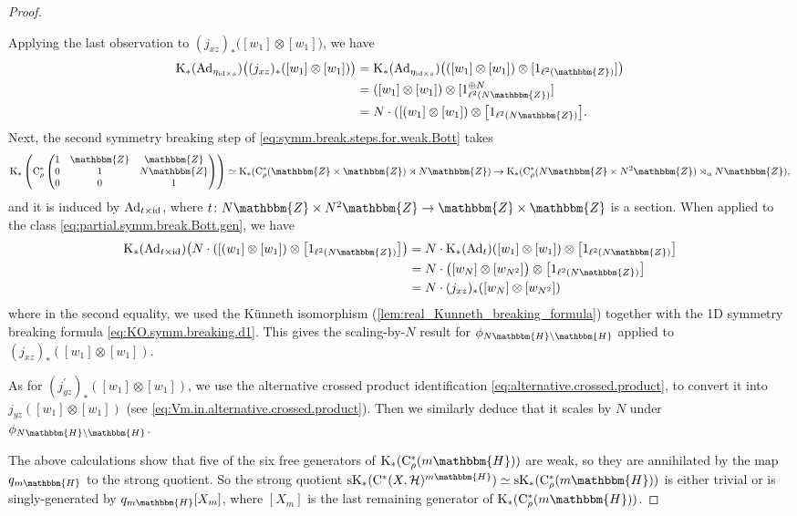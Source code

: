 \documentclass{amsart}
\numberwithin{figure}{section}
\numberwithin{equation}{section}
\numberwithin{table}{section}
\theoremstyle{plain}
\theoremstyle{definition}
\theoremstyle{remark}
\theoremstyle{nonumber}
\newcommand{\Z}{\mathbb{Z}}
\newcommand{\HH}{\mathbb{H}} %
\newcommand{\K}{\relax\ifmmode\operatorname{K}\else\textup{K}\fi}
\newcommand{\Cst}{\relax\ifmmode\mathrm{C}^*\else\textup{C*}\fi}
\newcommand{\Cstr}{\Cst_\rho} %
\newcommand{\Ad}{\operatorname{Ad}} %
\renewcommand{\mathbb}{\mathbbm} %
\begin{document}
\begin{proof}
\begin{itemize}
Applying the last observation to $(j_{xz})_*\big([w_{1}]\otimes [w_{1}]\big)$, we have
\begin{equation}\label{eq:partial.symm.break.Bott.gen}
\begin{aligned}
\K_*(\Ad_{\eta_{{\rm id}\times s}})\big((j_{xz})_*([w_1]\otimes [w_1])\big)
&=\K_*(\Ad_{\eta_{{\rm id}\times s}})\big(([w_1]\otimes [w_1])\otimes [1_{\ell^2(\Z)}]\big)\\
&=([w_1]\otimes [w_1])\otimes [1_{\ell^2(N\Z)}^{\oplus N}]\\
&=N\cdot ([(w_1]\otimes [w_1])\otimes \big[1_{\ell^2(N\Z)}\big].
\end{aligned}
\end{equation}
Next, the second symmetry breaking step of \eqref{eq:symm.break.steps.for.weak.Bott} takes
\[
\K_*\left(\Cstr\begin{pmatrix} 1 & \Z & \Z \\ 0 & 1 & N\Z\\ 0 & 0 & 1 \end{pmatrix}\right)\simeq \K_*(\Cstr(\Z\times \Z)\rtimes N\Z) \to\K_*(\Cstr(N\Z\times N^2\Z)\rtimes_\alpha N\Z),
\]
and it is induced by $\Ad_{t\times {\rm id}}$, where $t\colon N\Z\times N^2\Z\to \Z\times \Z$ is a section. When applied to the class \eqref{eq:partial.symm.break.Bott.gen}, we have
\begin{align*}
\K_*(\Ad_{t\times{\rm id}})\big(N\cdot ([(w_1]\otimes [w_1])\otimes \big[1_{\ell^2(N\Z)}\big]\big)
&=N\cdot\K_*(\Ad_t)([w_1]\otimes [w_1])\otimes \big[1_{\ell^2(N\Z)}\big]\\
&=N\cdot\big([w_N]\otimes [w_{N^2}]\big)\otimes \big[1_{\ell^2(N\Z)}\big]\\
&=N\cdot (j_{xz})_*([w_N]\otimes [w_{N^2}])
\end{align*}
where in the second equality, we used the K\"unneth isomorphism (\cref{lem:real_Kunneth_breaking_formula}) together with the 1D symmetry breaking formula \eqref{eq:KO.symm.breaking.d1}. This gives the scaling-by-$N$ result for $\phi_{N\HH\backslash \HH}$ applied to $(j_{xz})_*([w_1]\otimes [w_1])$.

As for $(j^\prime_{yz})_*([w_1]\otimes [w_1])$, we use the alternative crossed product identification \eqref{eq:alternative.crossed.product}, to convert it into $j_{yz}([w_1]\otimes[w_1])$ (see \eqref{eq:Vm.in.alternative.crossed.product}). Then we similarly deduce that it scales by $N$ under $\phi_{N\HH\backslash \HH}$.
\end{itemize}

The above calculations show that five of the six free generators of
$\K_*(\Cstr(m\HH))$ are weak, so they are annihilated by the map $q_{m\HH}$
to the strong quotient. So the strong quotient
${\rm sK}_*(\Cst(X,\mathcal{H})^{m\HH})\simeq{\rm
sK}_*(\Cstr(m\HH))$ is either trivial or is singly-generated by
$q_{m\HH}[X_m]$, where $[X_m]$ is the last remaining generator of
$\K_*(\Cstr(m\HH))$. 


\end{proof}
\end{document}
